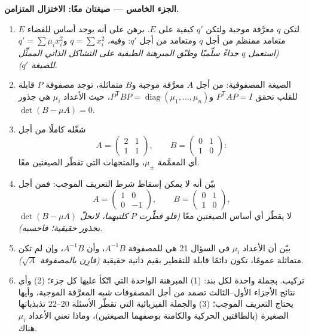 \begin{problem}
\medskip
\noindent\textbf{الجزء الخامس --- صيغتان معًا: الاختزال
المتزامن.}
\begin{enumerate}[resume]
  \item لتكن $q$ معرَّفة موجبة ولتكن $q'$ 
        كيفية على $E$. برهن على أنه يوجد أساس للفضاء
        $E$ متعامد ممنظم من أجل $q$ ومتعامد من أجل
        $q'$: وفيه، $q = \sum x_i^2$ و$q' = \sum \mu_i
        x_i^2$ \emph{(استعمل $q$ جداءً سلّميًا وطبّق
        المبرهنة الطيفية على التشاكل الذاتي الممثِّل
        للصيغة $q'$)}.
  \item الصيغة المصفوفية: من أجل $A$ معرَّفة موجبة و$B$
        متماثلة، توجد مصفوفة $P$ قابلة للقلب تحقق
        $P^{\mathsf T}AP = I$ و$P^{\mathsf T}BP =
        \operatorname{diag}(\mu_1, \dots, \mu_n)$، حيث
        الأعداد $\mu_i$ هي جذور $\det(B - \mu A) = 0$.
  \item شغّله كاملًا من أجل
        \[
        A = \begin{pmatrix} 2 & 1\\ 1 & 1 \end{pmatrix},
        \qquad
        B = \begin{pmatrix} 0 & 1\\ 1 & 0 \end{pmatrix} :
        \]
        أي  المعمَّمة $\mu_\pm$، والمتجهات
        التي تقطّر الصيغتين معًا.
  \item بيّن أنه لا يمكن إسقاط شرط التعريف الموجب: فمن أجل
        \[
        A = \begin{pmatrix} 1 & 0\\ 0 & -1 \end{pmatrix},
        \qquad
        B = \begin{pmatrix} 0 & 1\\ 1 & 0 \end{pmatrix},
        \]
        لا يقطّر أي أساس الصيغتين معًا \emph{(فلو قطّرت $P$
        كلتيهما، لانحلّ $\det(B - \mu A)$ بجذور
        حقيقية؛ فاحسبه)}.
  \item بيّن أن الأعداد $\mu_i$ في السؤال 21 هي
         للمصفوفة $A^{-1}B$، وأن $A^{-1}B$، وإن لم تكن
        متماثلة عمومًا، تكون دائمًا قابلة للتقطير بقيم ذاتية
        حقيقية \emph{(قارِن بالمصفوفة $\sqrt A$)}.
  \item تركيب. بجملة واحدة لكل بند: (1) المبرهنة الواحدة
        التي اتّكأ عليها كل جزء؛ (2) وأي نتائج الأجزاء
        الأول--الثالث تصمد من أجل المصفوفات \emph{شبه} المعرَّفة
        الموجبة، وأيها يحتاج التعريف الموجب؛ (3) والجملة
        الفيزيائية التي تقطّر الأسئلة 20--22 تذبذباتها
        الصغيرة (بالطاقتين الحركية والكامنة بوصفهما
        الصيغتين)، وماذا تعني الأعداد $\mu_i$ هناك.
\end{enumerate}
\end{problem}
